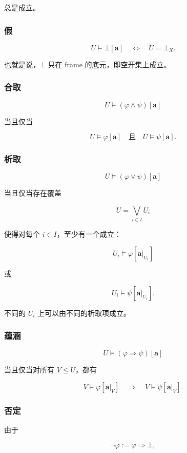 \documentclass{ctexart}
\begin{document}
总是成立。

\subsubsection*{假}

\[
U\models\bot[\mathbf a]
\quad\Longleftrightarrow\quad
U=\bot_X.
\]

也就是说，$\bot$ 只在 frame 的底元，即空开集上成立。

\subsubsection*{合取}

\[
U\models(\varphi\wedge\psi)[\mathbf a]
\]

当且仅当

\[
U\models\varphi[\mathbf a]
\quad\text{且}\quad
U\models\psi[\mathbf a].
\]

\subsubsection*{析取}

\[
U\models(\varphi\vee\psi)[\mathbf a]
\]

当且仅当存在覆盖

\[
U=\bigvee_{i\in I}U_i
\]

使得对每个 $i\in I$，至少有一个成立：

\[
U_i\models\varphi[\mathbf a|_{U_i}]
\]

或

\[
U_i\models\psi[\mathbf a|_{U_i}].
\]

不同的 $U_i$ 上可以由不同的析取项成立。

\subsubsection*{蕴涵}

\[
U\models(\varphi\Rightarrow\psi)[\mathbf a]
\]

当且仅当对所有 $V\le U$，都有

\[
V\models\varphi[\mathbf a|_V]
\quad\Longrightarrow\quad
V\models\psi[\mathbf a|_V].
\]

\subsubsection*{否定}

由于

\[
\neg\varphi:=\varphi\Rightarrow\bot,
\]
\end{document}
